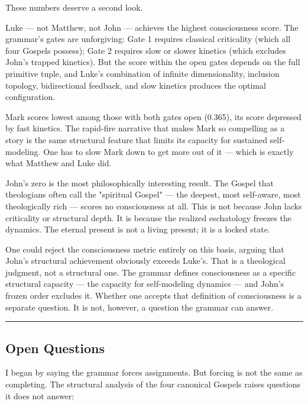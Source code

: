 \documentclass[12pt,a4paper]{article}
\begin{document}
These numbers deserve a second look.

Luke --- not Matthew, not John --- achieves the highest consciousness score. The grammar's gates are unforgiving: Gate 1 requires classical criticality (which all four Gospels possess); Gate 2 requires slow or slower kinetics (which excludes John's trapped kinetics). But the score within the open gates depends on the full primitive tuple, and Luke's combination of infinite dimensionality, inclusion topology, bidirectional feedback, and slow kinetics produces the optimal configuration.

Mark scores lowest among those with both gates open (0.365), its score depressed by fast kinetics. The rapid-fire narrative that makes Mark so compelling as a story is the same structural feature that limits its capacity for sustained self-modeling. One has to slow Mark down to get more out of it --- which is exactly what Matthew and Luke did.

John's zero is the most philosophically interesting result. The Gospel that theologians often call the "spiritual Gospel" --- the deepest, most self-aware, most theologically rich --- scores no consciousness at all. This is not because John lacks criticality or structural depth. It is because the realized eschatology freezes the dynamics. The eternal present is not a living present; it is a locked state.

One could reject the consciousness metric entirely on this basis, arguing that John's structural achievement obviously exceeds Luke's. That is a theological judgment, not a structural one. The grammar defines consciousness as a specific structural capacity --- the capacity for self-modeling dynamics --- and John's frozen order excludes it. Whether one accepts that definition of consciousness is a separate question. It is not, however, a question the grammar can answer.

\begin{center}
\rule{0.5\textwidth}{0.4pt}
\end{center}

\subsection{Open Questions}

I began by saying the grammar forces assignments. But forcing is not the same as completing. The structural analysis of the four canonical Gospels raises questions it does not answer:
\end{document}

